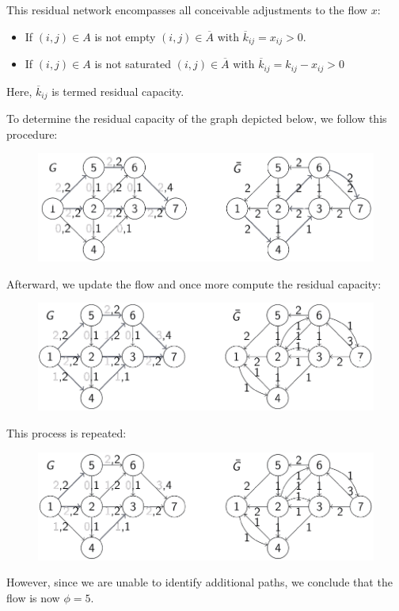 This residual network encompasses all conceivable adjustments to the flow $x$: 
\begin{itemize}
    \item If $(i,j) \in A$ is not empty $(i,j) \in \overline{A}$ with $\overline{k}_{ij}=x_{ij}>0$.
    \item If $(i,j) \in A$ is not saturated $(i,j) \in \overline{A}$ with $\overline{k}_{ij}=k_{ij}-x_{ij}>0$
\end{itemize}
Here, $\overline{k}_{ij}$ is termed residual capacity. 
\begin{example}
    To determine the residual capacity of the graph depicted below, we follow this procedure:
    \begin{figure}[H]
        \centering
        \includegraphics[width=0.75\linewidth]{images/residual1.png}
    \end{figure}
    Afterward, we update the flow and once more compute the residual capacity:
    \begin{figure}[H]
        \centering
        \includegraphics[width=0.75\linewidth]{images/residual2.png}
    \end{figure}
    This process is repeated:
    \begin{figure}[H]
        \centering
        \includegraphics[width=0.75\linewidth]{images/residual3.png}
    \end{figure}
    However, since we are unable to identify additional paths, we conclude that the flow is now $\phi=5$.
\end{example}
